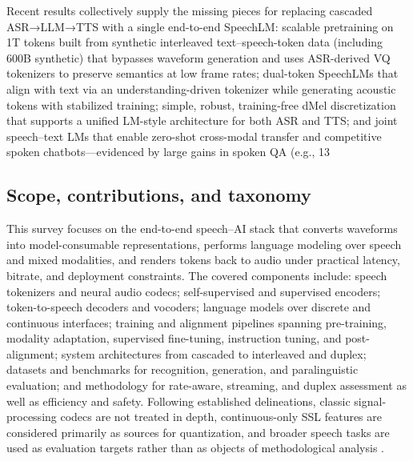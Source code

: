 \documentclass{article}
\begin{document}
Recent results collectively supply the missing pieces for replacing cascaded ASR→LLM→TTS with a single end-to-end SpeechLM: scalable pretraining on 1T tokens built from synthetic interleaved text–speech-token data (including 600B synthetic) that bypasses waveform generation and uses ASR-derived VQ tokenizers to preserve semantics at low frame rates; dual-token SpeechLMs that align with text via an understanding-driven tokenizer while generating acoustic tokens with stabilized training; simple, robust, training‑free dMel discretization that supports a unified LM-style architecture for both ASR and TTS; and joint speech–text LMs that enable zero-shot cross-modal transfer and competitive spoken chatbots—evidenced by large gains in spoken QA (e.g., 13%



\subsection{Scope, contributions, and taxonomy} \label{subsec:Scope, contributions, and taxonomy}

This survey focuses on the end-to-end speech–AI stack that converts waveforms into model-consumable representations, performs language modeling over speech and mixed modalities, and renders tokens back to audio under practical latency, bitrate, and deployment constraints. The covered components include: speech tokenizers and neural audio codecs; self-supervised and supervised encoders; token-to-speech decoders and vocoders; language models over discrete and continuous interfaces; training and alignment pipelines spanning pre-training, modality adaptation, supervised fine-tuning, instruction tuning, and post-alignment; system architectures from cascaded to interleaved and duplex; datasets and benchmarks for recognition, generation, and paralinguistic evaluation; and methodology for rate-aware, streaming, and duplex assessment as well as efficiency and safety. Following established delineations, classic signal-processing codecs are not treated in depth, continuous-only SSL features are considered primarily as sources for quantization, and broader speech tasks are used as evaluation targets rather than as objects of methodological analysis \cite{guo2025recentadvancesdiscretespeechtokensreview}.
\end{document}
